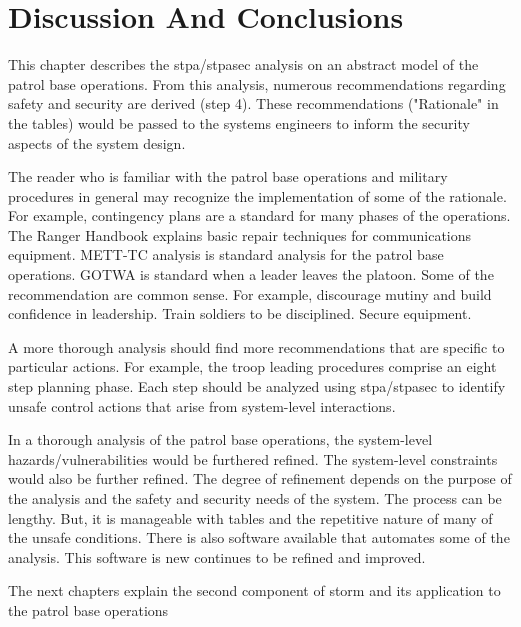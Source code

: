 \documentclass[../../main/main.tex]{subfiles}
\begin{document}
\section{Discussion And Conclusions}\label{chp:stpapb:discuss}
This chapter describes the \gls{stpa}/\gls{stpasec} analysis on an abstract model of the patrol base operations.  From this analysis, numerous recommendations regarding safety and security are derived (step 4).  These recommendations ("Rationale" in the tables) would be passed to the systems engineers to inform the security aspects of the system design.  

The reader who is familiar with the patrol base operations and military procedures in general may recognize the implementation of some of the rationale.  For example, contingency plans are a standard for many phases of the operations.  The Ranger Handbook explains basic repair techniques for communications equipment.   METT-TC analysis is standard analysis for the patrol base operations.  GOTWA is standard when a leader leaves the platoon.  Some of the recommendation are common sense.  For example, discourage mutiny and build confidence in leadership.  Train soldiers to be disciplined.  Secure equipment. 

A more thorough analysis should find more recommendations that are specific to particular actions.  For example, the troop leading procedures comprise an eight step planning phase.  Each step should be analyzed using \gls{stpa}/\gls{stpasec} to identify unsafe control actions that arise from system-level interactions.  

In a thorough analysis of the patrol base operations, the system-level hazards/vulnerabilities would be furthered refined.  The system-level constraints would also be further refined.  The degree of refinement depends on the purpose of the analysis and the safety and security needs of the system.  The process can be lengthy.  But, it is manageable with tables and the repetitive nature of many of the unsafe conditions.  There is also software available that automates some of the analysis.  This software is new continues to be refined and improved.  


The next chapters explain the second component of \gls{storm} and its application to the patrol base operations
\end{document}
